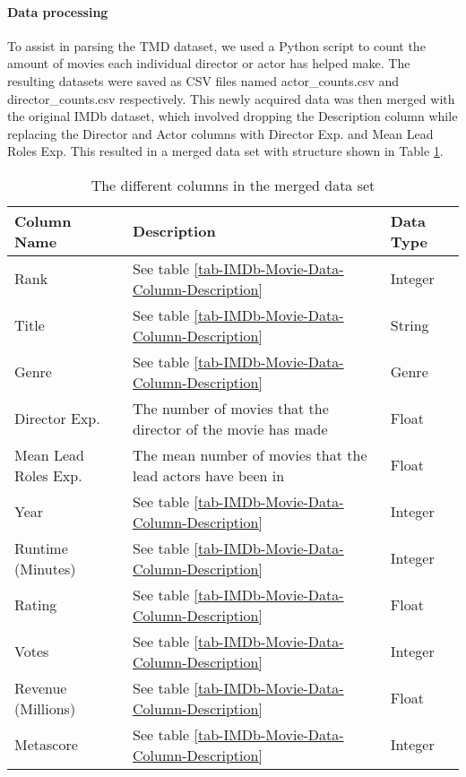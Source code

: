     \paragraph{Data processing}
        To assist in parsing the TMD dataset, we used a Python script to count the
            amount of movies each individual director or actor has helped make.
        The resulting datasets were saved as CSV files named actor\_counts.csv and
            director\_counts.csv respectively.
        This newly acquired data was then merged with the original IMDb dataset, which
            involved dropping the Description column while replacing the Director and Actor
            columns with Director Exp.
        and Mean Lead Roles Exp.
        This resulted in a merged data set with structure shown in Table
            \ref*{tab-merged-data-column-description}.
        \begin{table}[h]
            \begin{tabular}{lp{9cm}l}
                \toprule
                Column Name          & Description                                                  & Data Type \\
                \midrule
                Rank                 & See table \ref*{tab-IMDb-Movie-Data-Column-Description}      & Integer   \\
                Title                & See table \ref*{tab-IMDb-Movie-Data-Column-Description}      & String    \\
                Genre                & See table \ref*{tab-IMDb-Movie-Data-Column-Description}      & Genre     \\
                Director Exp.        & The number of movies that the director of the movie has made & Float     \\
                Mean Lead Roles Exp. & The mean number of movies that the lead actors have been in  & Float     \\
                Year                 & See table \ref*{tab-IMDb-Movie-Data-Column-Description}      & Integer   \\
                Runtime (Minutes)    & See table \ref*{tab-IMDb-Movie-Data-Column-Description}      & Integer   \\
                Rating               & See table \ref*{tab-IMDb-Movie-Data-Column-Description}      & Float     \\
                Votes                & See table \ref*{tab-IMDb-Movie-Data-Column-Description}      & Integer   \\
                Revenue (Millions)   & See table \ref*{tab-IMDb-Movie-Data-Column-Description}      & Float     \\
                Metascore            & See table \ref*{tab-IMDb-Movie-Data-Column-Description}      & Integer   \\
                \bottomrule
            \end{tabular}
            \caption[short]{The different columns in the merged data set}\label{tab-merged-data-column-description}
        \end{table}

